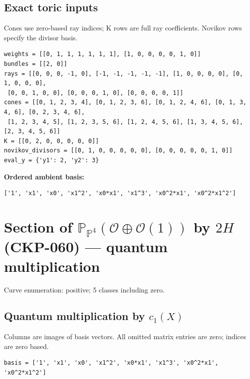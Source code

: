 \documentclass[10pt,a4paper]{article}
\begin{document}
\subsection*{Exact toric inputs}
Cones use zero-based ray indices; K rows are full ray coefficients. Novikov rows specify the divisor basis.

\begin{lstlisting}
weights = [[0, 1, 1, 1, 1, 1, 1], [1, 0, 0, 0, 0, 1, 0]]
bundles = [[2, 0]]
rays = [[0, 0, 0, -1, 0], [-1, -1, -1, -1, -1], [1, 0, 0, 0, 0], [0, 1, 0, 0, 0],
 [0, 0, 1, 0, 0], [0, 0, 0, 1, 0], [0, 0, 0, 0, 1]]
cones = [[0, 1, 2, 3, 4], [0, 1, 2, 3, 6], [0, 1, 2, 4, 6], [0, 1, 3, 4, 6], [0, 2, 3, 4, 6],
 [1, 2, 3, 4, 5], [1, 2, 3, 5, 6], [1, 2, 4, 5, 6], [1, 3, 4, 5, 6], [2, 3, 4, 5, 6]]
K = [[0, 2, 0, 0, 0, 0, 0]]
novikov_divisors = [[0, 1, 0, 0, 0, 0, 0], [0, 0, 0, 0, 0, 1, 0]]
eval_y = {'y1': 2, 'y2': 3}
\end{lstlisting}

\textbf{Ordered ambient basis:}
\begin{lstlisting}
['1', 'x1', 'x0', 'x1^2', 'x0*x1', 'x1^3', 'x0^2*x1', 'x0^2*x1^2']
\end{lstlisting}

\clearpage\section*{Section of $\mathbb P_{\mathbb P^{4}}(\mathcal O\oplus \mathcal O(1))$ by $2H$ (CKP-060) --- quantum multiplication}

Curve enumeration: positive; 5 classes including zero.
\subsection*{Quantum multiplication by $c_1(X)$}
Columns are images of basis vectors. All omitted matrix entries are zero; indices are zero based.

\begin{lstlisting}
basis = ['1', 'x1', 'x0', 'x1^2', 'x0*x1', 'x1^3', 'x0^2*x1', 'x0^2*x1^2']
\end{lstlisting}
\end{document}
